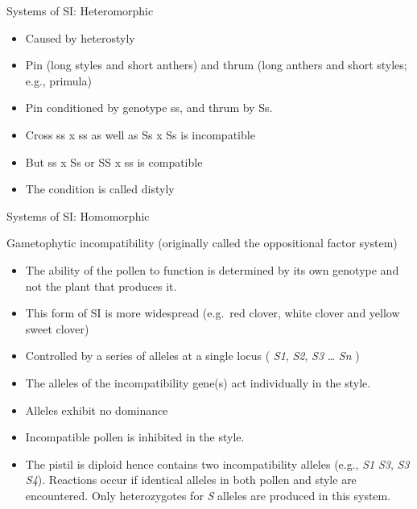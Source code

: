 \documentclass[11pt,ignorenonframetext,aspectratio=169]{beamer}
\providecommand{\tightlist}{%
  \setlength{\itemsep}{0pt}\setlength{\parskip}{0pt}}
\begin{document}
\begin{frame}{Systems of SI: Heteromorphic}
\protect\hypertarget{systems-of-si-heteromorphic}{}
\begin{itemize}
\tightlist
\item
  Caused by heterostyly
\item
  Pin (long styles and short anthers) and thrum (long anthers and short
  styles; e.g., primula)
\item
  Pin conditioned by genotype ss, and thrum by Ss.
\item
  Cross ss x ss as well as Ss x Ss is incompatible
\item
  But ss x Ss or SS x ss is compatible
\item
  The condition is called distyly
\end{itemize}
\end{frame}

\begin{frame}{Systems of SI: Homomorphic}
\protect\hypertarget{systems-of-si-homomorphic}{}
\begin{block}{Gametophytic incompatibility (originally called the
oppositional factor system)}
\protect\hypertarget{gametophytic-incompatibility-originally-called-the-oppositional-factor-system}{}
\begin{itemize}
\tightlist
\item
  The ability of the pollen to function is determined by its own
  genotype and not the plant that produces it.
\item
  This form of SI is more widespread (e.g.~red clover, white clover and
  yellow sweet clover)
\item
  Controlled by a series of alleles at a single locus ( \emph{S1},
  \emph{S2}, \emph{S3} \ldots{} \emph{Sn} )
\item
  The alleles of the incompatibility gene(s) act individually in the
  style.
\item
  Alleles exhibit no dominance
\item
  Incompatible pollen is inhibited in the style.
\item
  The pistil is diploid hence contains two incompatibility alleles
  (e.g., \emph{S1} \emph{S3}, \emph{S3} \emph{S4}). Reactions occur if
  identical alleles in both pollen and style are encountered. Only
  heterozygotes for \emph{S} alleles are produced in this system.
\end{itemize}
\end{block}
\end{frame}
\end{document}
